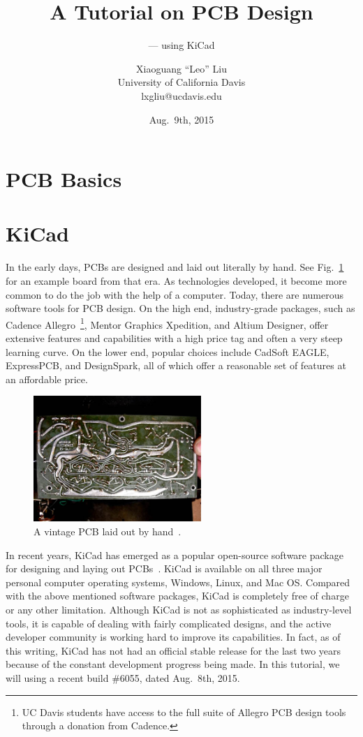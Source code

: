 \documentclass[12pt,letterpaper]{scrartcl}
\title{A Tutorial on PCB Design}
\subtitle{--- using KiCad}
\author{Xiaoguang ``Leo'' Liu \\University of California Davis \\ lxgliu@ucdavis.edu}
\date{Aug.~9th, 2015}
\begin{document}
\maketitle

\tableofcontents

\newpage
\section{PCB Basics}


\newpage
\section{KiCad}
In the early days, PCBs are designed and laid out literally by hand. See Fig.~\ref{fig:hand-pcb} for an example board from that era. As technologies developed, it become more common to do the job with the help of a computer. Today, there are numerous software tools for PCB design. On the high end, industry-grade packages, such as Cadence Allegro~\footnote{UC Davis students have access to the full suite of Allegro PCB design tools through a donation from Cadence.}, Mentor Graphics Xpedition, and Altium Designer, offer extensive features and capabilities with a high price tag and often a very steep learning curve. On the lower end, popular choices include CadSoft EAGLE, ExpressPCB, and DesignSpark, all of which offer a reasonable set of features at an affordable price. 

\begin{figure}[ht]
\centering
\includegraphics[width=2.5in]{hand-pcb.jpg}
\caption{A vintage PCB laid out by hand~\cite{hand-pcb}.}
\label{fig:hand-pcb}
\end{figure}

In recent years, KiCad has emerged as a popular open-source software package for designing and laying out PCBs~\cite{kicad}. KiCad is available on all three major personal computer operating systems, Windows, Linux, and Mac OS. 
Compared with the above mentioned software packages, KiCad is completely free of charge or any other limitation. Although KiCad is not as sophisticated as industry-level tools, it is capable of dealing with fairly complicated designs, and the active developer community is working hard to improve its capabilities. In fact, as of this writing, KiCad has not had an official stable release for the last two years because of the constant development progress being made. In this tutorial, we will using a recent build \#6055, dated Aug.~8th, 2015.
\end{document}
